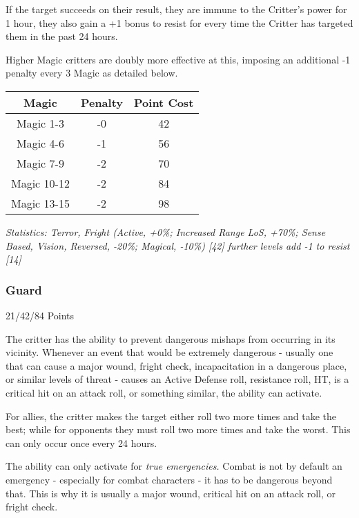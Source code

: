 \begin{multicols*}{3}
	If the target succeeds on their result, they are immune to the Critter's power for 1 hour, they also gain a +1 bonus to resist for every time the Critter has targeted them in the past 24 hours.
	
	Higher Magic critters are doubly more effective at this, imposing an additional -1 penalty every 3 Magic as detailed below.
	
	\begin{center}
		\begin{tabular}{|c|c|c|}
			\hline
			Magic & Penalty & Point Cost\\
			\hline
			\hline
			Magic 1-3 & -0 & 42 \\
			Magic 4-6 & -1 & 56 \\
			Magic 7-9 & -2 & 70 \\
			Magic 10-12 & -2 & 84 \\
			Magic 13-15 & -2 & 98 \\
			\hline
		\end{tabular}
	\end{center}
	
	\textcolor{OliveGreen}{\textit{Statistics: Terror, Fright (Active, +0\%; Increased Range LoS, +70\%; Sense Based, Vision, Reversed, -20\%; Magical, -10\%) [42] further levels add -1 to resist [14]
	}}
	
	
	\subsubsection{Guard}\label{guard}
	\begin{flushright}
		21/42/84 Points
	\end{flushright}
	
	The critter has the ability to prevent dangerous mishaps from occurring in its vicinity. Whenever an event that would be extremely dangerous - usually one that can cause a major wound, fright check, incapacitation in a dangerous place, or similar levels of threat - causes an Active Defense roll, resistance roll, HT, is a critical hit on an attack roll, or something similar, the ability can activate.
	
	For allies, the critter makes the target either roll two more times and take the best; while for opponents they must roll two more times and take the worst. This can only occur once every 24 hours.
	
	The ability can only activate for \textit{true emergencies.} Combat is not by default an emergency - especially for combat characters - it has to be dangerous beyond that. This is why it is usually a major wound, critical hit on an attack roll, or fright check.
	

\end{multicols*}
